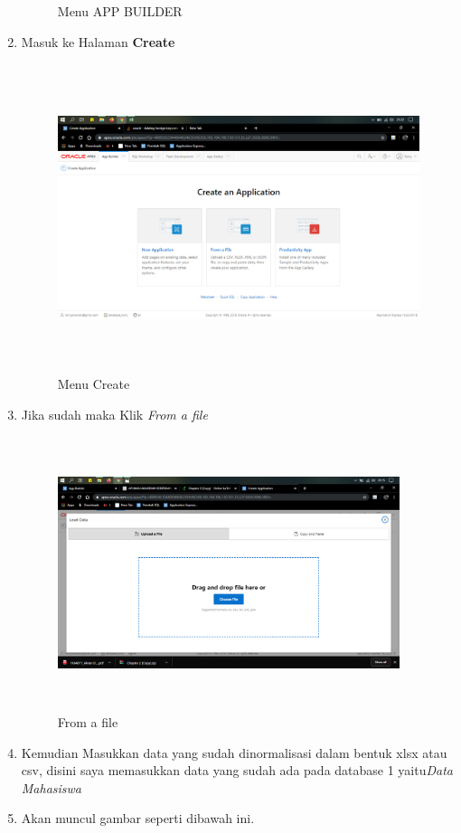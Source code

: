 \begin{enumerate}
\begin{figure}[!htbp]
\caption{Menu APP BUILDER}
\label{penanda}
\end{figure}
    \item Masuk ke Halaman \textbf{Create}
\begin{figure}[!htbp]
\centering
\includegraphics[width=11cm,height=9cm]{figures/3.PNG}
\caption{Menu Create}
\label{penanda}
\end{figure}
    \item Jika sudah maka Klik \textit{From a file}
\begin{figure}[!htbp]
\centering
\includegraphics[width=10cm,height=8cm]{figures/4.PNG}
\caption{From a file}
\label{penanda}
\end{figure}
\item Kemudian Masukkan data yang sudah dinormalisasi dalam bentuk xlsx atau csv, disini saya memasukkan data yang sudah ada pada database 1 yaitu\textit{Data Mahasiswa} 
\item Akan muncul gambar seperti dibawah ini.

\end{enumerate}
